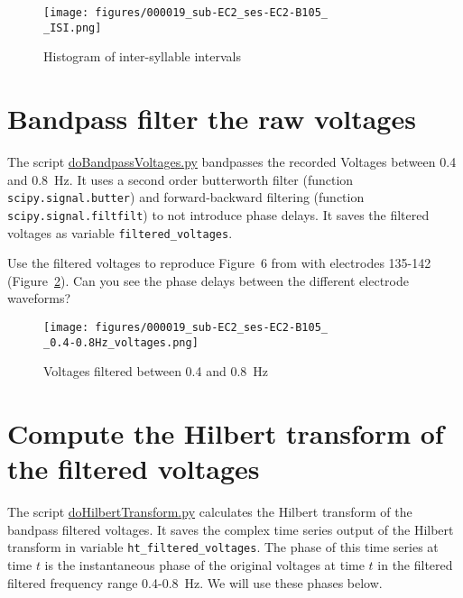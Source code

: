 \documentclass[12pt]{article}
\begin{document}
\begin{figure}
    \begin{center}
        \texttt{[image: figures/000019\_sub-EC2\_ses-EC2-B105\_\\[135,136,137,138,139,140,141,142\\]\_ISI.png]}
    \end{center}
    \caption{Histogram of inter-syllable intervals}
    \label{fig:isis}
\end{figure}

\section{Bandpass filter the raw voltages}

The script
\href{https://github.com/joacorapela/neuroinformatics24/blob/master/worksheets/04_circularStats/code/scripts/doBandpassVoltages.py}{doBandpassVoltages.py}
bandpasses the recorded Voltages between 0.4 and 0.8~Hz. It uses a second order
butterworth filter (function \texttt{scipy.signal.butter}) and forward-backward
filtering (function \texttt{scipy.signal.filtfilt}) to not introduce phase
delays. It saves the filtered voltages as variable \texttt{filtered\_voltages}.

Use the filtered voltages to reproduce Figure~6 from
\citet{rapelaInPrepTWsInSpeech} with electrodes 135-142
(Figure~\ref{fig:filteredVoltages}). Can you see the phase delays between the
different electrode waveforms?

\begin{figure}
    \begin{center}
        \texttt{[image: figures/000019\_sub-EC2\_ses-EC2-B105\_\\[135,136,137,138,139,140,141,142\\]\_0.4-0.8Hz\_voltages.png]}
    \end{center}
    \caption{Voltages filtered between 0.4 and 0.8~Hz}
    \label{fig:filteredVoltages}
\end{figure}

\section{Compute the Hilbert transform of the filtered voltages}

The script
\href{https://github.com/joacorapela/neuroinformatics24/blob/master/worksheets/04_circularStats/code/scripts/doHilbertTransform.py}{doHilbertTransform.py}
calculates the Hilbert transform of the bandpass filtered voltages. It saves
the complex time series output of the Hilbert transform in variable
\texttt{ht\_filtered\_voltages}. The phase of this time
series at time $t$ is the instantaneous phase of the original voltages at time
$t$ in the filtered filtered frequency range 0.4-0.8~Hz. We will use these
phases below.
\end{document}
